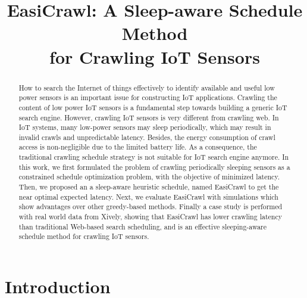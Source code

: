 \documentclass[conference]{IEEEtran}
\begin{document}
\title{EasiCrawl: A Sleep-aware Schedule Method \\for Crawling IoT Sensors}

\author{
}

\maketitle


\begin{abstract}
	
How to search the Internet of things effectively to identify available and useful low power sensors is an important issue for constructing IoT applications. 
Crawling the content of low power IoT sensors is a fundamental step towards building a generic IoT search engine.
However, crawling IoT sensors is very different from crawling web. 
In IoT systems, many low-power sensors may sleep periodically, which may result in invalid crawls and unpredictable latency. 
Besides, the energy consumption of crawl access is non-negligible due to the limited battery life.
As a consequence, the traditional crawling schedule strategy is not suitable for IoT search engine anymore.
In this work, we first formulated the problem of crawling periodically sleeping sensors as a constrained schedule optimization problem, with the objective of minimized latency. 
Then, we proposed an a sleep-aware heuristic schedule, named EasiCrawl to get the near optimal expected latency. 
Next, we evaluate EasiCrawl with simulations which show advantages over other greedy-based methods.
Finally a case study is performed with real world data from Xively, showing that EasiCrawl has lower crawling latency than traditional Web-based search scheduling, and is an effective sleeping-aware schedule method for crawling IoT sensors.

\end{abstract}

\IEEEpeerreviewmaketitle

\section{Introduction} \label{introduction}
\end{document}
